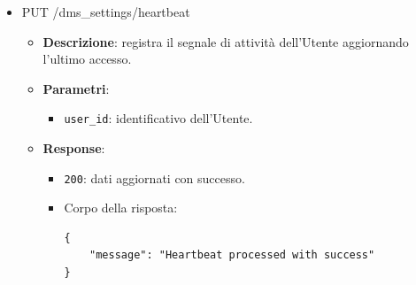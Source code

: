 \documentclass[a4paper,12pt]{article}
\newcommand{\code}[1]{{\ttfamily\textcolor{purple!85!black}{#1}}}
\begin{document}
\begin{itemize}
\begin{itemize}
            \item \textbf{Response}:
            \begin{itemize}
                \item \texttt{204 OK}: aggiornamento della configurazione avvenuto con successo.
                \item Corpo della risposta:
\begin{verbatim}
{
    "user_id": "user1",
    "is_active": true,
    "first_timer": 60,
    "second_timer": 120,
    "email_subject": "Messaggio di emergenza",
    "email_body": "Corpo del messaggio"
}
\end{verbatim}

            \end{itemize}
            \item \textbf{Errori}:
            \begin{itemize}
                \item \texttt{500 Internal Server Error}: errore interno del server.
            \end{itemize}
        \end{itemize}

    \item \code{PUT /dms\_settings/heartbeat}
        \begin{itemize}
            \item \textbf{Descrizione}: registra il segnale di attività dell’Utente aggiornando l’ultimo accesso.
            
            \item \textbf{Parametri}:
            \begin{itemize}
                \item \texttt{user\_id}: identificativo dell’Utente.
            \end{itemize}

            \item \textbf{Response}:
            \begin{itemize}
                \item \texttt{200}: dati aggiornati con successo.
                \item Corpo della risposta:
\begin{verbatim}
{
    "message": "Heartbeat processed with success"
}
\end{verbatim}
            \end{itemize}
        \end{itemize}



\end{itemize}
\end{document}
